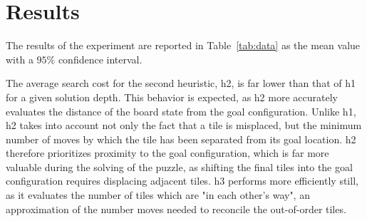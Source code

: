 
\section{Results}
\label{sec:results}

The results of the experiment are reported in Table~\ref{tab:data} as the mean value with a $95\%$ confidence interval. 

The average search cost for the second heuristic, h2, is far lower than that of h1 for a given solution depth.  This behavior is expected, as h2 more accurately evaluates the distance of the board state from the goal configuration.  Unlike h1, h2 takes into account not only the fact that a tile is misplaced, but the minimum number of moves by which the tile has been separated from its goal location.  h2 therefore prioritizes proximity to the goal configuration, which is far more valuable during the solving of the puzzle, as shifting the final tiles into the goal configuration requires displacing adjacent tiles. h3 performs more efficiently still, as it evaluates the number of tiles which are "in each other's way", an approximation of the number moves needed to reconcile the out-of-order tiles.





